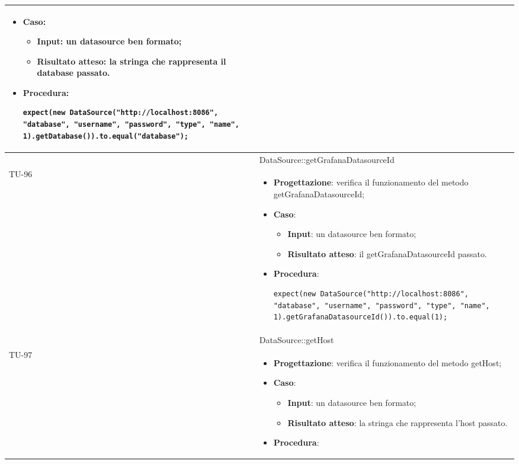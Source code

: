 \begin{longtable}{|C{1.5cm}|C{14.5cm}|}
\begin{itemize}
	\item \textbf{Caso}: 
	\begin{itemize}
		\item \textbf{Input}: un datasource ben formato;
		\item \textbf{Risultato atteso}: la stringa che rappresenta il database passato.
	\end{itemize}
	\item \textbf{Procedura}:
	\begin{lstlisting}
expect(new DataSource("http://localhost:8086", "database", "username", "password", "type", "name", 1).getDatabase()).to.equal("database");
	\end{lstlisting}
\end{itemize}\\
\hline
{} & DataSource::getGrafanaDatasourceId
\\ \hline
{TU-96} &
\begin{itemize}
	\item \textbf{Progettazione}: verifica il funzionamento del metodo getGrafanaDatasourceId;
	\item \textbf{Caso}: 
	\begin{itemize}
		\item \textbf{Input}: un datasource ben formato;
		\item \textbf{Risultato atteso}: il getGrafanaDatasourceId passato.
	\end{itemize}
	\item \textbf{Procedura}:
	\begin{lstlisting}
expect(new DataSource("http://localhost:8086", "database", "username", "password", "type", "name", 1).getGrafanaDatasourceId()).to.equal(1);
	\end{lstlisting}
\end{itemize}\\
\hline
{} & DataSource::getHost
\\ \hline
{TU-97} &
\begin{itemize}
	\item \textbf{Progettazione}: verifica il funzionamento del metodo getHost;
	\item \textbf{Caso}: 
	\begin{itemize}
		\item \textbf{Input}: un datasource ben formato;
		\item \textbf{Risultato atteso}: la stringa che rappresenta l'host passato.
	\end{itemize}
	\item \textbf{Procedura}:

\end{itemize}
\end{longtable}
